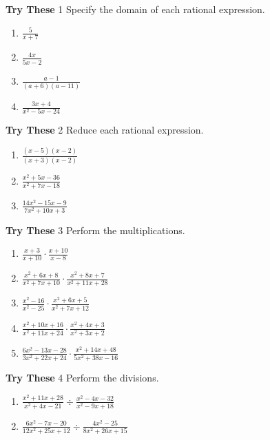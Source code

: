 \documentclass[a4paper]{JAC2003}
\begin{document}
\noindent\textcolor{red!75!black}{\textbf{Try These}} 1 Specify the domain of each rational expression.
\begin{enumerate}
\item $\frac{5}{x+7}$

\item $\frac{4 x}{5 x-2}$

\item $\frac{a-1}{(a+6)(a-11)}$

\item $\frac{3 x+4}{x^{2}-5 x-24}$
\end{enumerate}

\noindent\textcolor{red!75!black}{\textbf{Try These}} 2 Reduce each rational expression.
\begin{enumerate}
\item $\frac{(x-5)(x-2)}{(x+3)(x-2)}$

\item $\frac{x^{2}+5 x-36}{x^{2}+7 x-18}$

\item $\frac{14 x^{2}-15 x-9}{7 x^{2}+10 x+3}$
\end{enumerate}

\noindent\textcolor{red!75!black}{\textbf{Try These}} 3 Perform the multiplications. %
\begin{enumerate}
\item $\frac{x+3}{x+10} \cdot \frac{x+10}{x-8}$

\item $\frac{x^{2}+6 x+8}{x^{2}+7 x+10} \cdot \frac{x^{2}+8 x+7}{x^{2}+11 x+28}$

\item $\frac{x^{2}-16}{x^{2}-25} \cdot \frac{x^{2}+6 x+5}{x^{2}+7 x+12}$

\item $\frac{x^{2}+10 x+16}{x^{2}+11 x+24} \cdot \frac{x^{2}+4 x+3}{x^{2}+3 x+2}$

\item $\frac{6 x^{2}-13 x-28}{3 x^{2}+22 x+24} \cdot \frac{x^{2}+14 x+48}{5 x^{2}+38 x-16}$
\end{enumerate}

\noindent\textcolor{red!75!black}{\textbf{Try These}} 4 Perform the divisions.
\begin{enumerate}
\item $\frac{x^{2}+11 x+28}{x^{2}+4 x-21} \div \frac{x^{2}-4 x-32}{x^{2}-9 x+18}$

\item $\frac{6 x^{2}-7 x-20}{12 x^{2}+25 x+12} \div \frac{4 x^{2}-25}{8 x^{2}+26 x+15}$
\end{enumerate}
\end{document}
